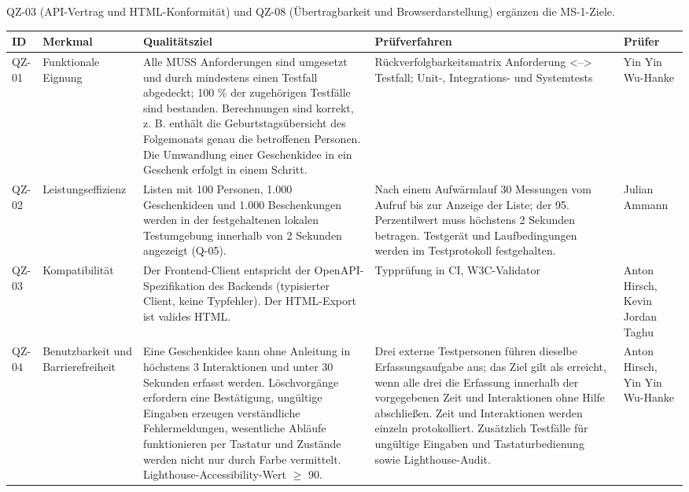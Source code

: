 \documentclass[11pt,a4paper]{article}
\begin{document}
QZ-03 (API-Vertrag und HTML-Konformität) und QZ-08 (Übertragbarkeit und Browserdarstellung) ergänzen die MS-1-Ziele.

{\small
\begin{tabularx}{\linewidth}{@{}l >{\hsize=0.68\hsize\RaggedRight\arraybackslash}X >{\hsize=1.67\hsize\RaggedRight\arraybackslash}X >{\hsize=1.16\hsize\RaggedRight\arraybackslash}X >{\hsize=0.48\hsize\RaggedRight\arraybackslash}X@{}}
\toprule
\textbf{ID} & \textbf{Merkmal} & \textbf{Qualitätsziel} & \textbf{Prüfverfahren} & \textbf{Prüfer} \\
\midrule
\endhead
QZ-01 & Funktionale Eignung & Alle MUSS Anforderungen sind umgesetzt und durch mindestens einen Testfall abgedeckt; 100 \% der zugehörigen Testfälle sind bestanden. Berechnungen sind korrekt, z. B. enthält die Geburtstagsübersicht des Folgemonats genau die betroffenen Personen. Die Umwandlung einer Geschenkidee in ein Geschenk erfolgt in einem Schritt. & Rückverfolgbarkeitsmatrix Anforderung <--> Testfall; Unit-, Integrations- und Systemtests & Yin Yin Wu-Hanke \\
QZ-02 & Leistungseffizienz & Listen mit 100 Personen, 1.000 Geschenkideen und 1.000 Beschenkungen werden in der festgehaltenen lokalen Testumgebung innerhalb von 2 Sekunden angezeigt (Q-05). & Nach einem Aufwärmlauf 30 Messungen vom Aufruf bis zur Anzeige der Liste; der 95. Perzentilwert muss höchstens 2 Sekunden betragen. Testgerät und Laufbedingungen werden im Testprotokoll festgehalten. & Julian Ammann \\
QZ-03 & Kompatibilität & Der Frontend-Client entspricht der OpenAPI-Spezifikation des Backends (typisierter Client, keine Typfehler). Der HTML-Export ist valides HTML. & Typprüfung in CI, W3C-Validator & Anton Hirsch, Kevin Jordan Taghu \\
QZ-04 & Benutzbarkeit und Barrierefreiheit & Eine Geschenkidee kann ohne Anleitung in höchstens 3 Interaktionen und unter 30 Sekunden erfasst werden. Löschvorgänge erfordern eine Bestätigung, ungültige Eingaben erzeugen verständliche Fehlermeldungen, wesentliche Abläufe funktionieren per Tastatur und Zustände werden nicht nur durch Farbe vermittelt. Lighthouse-Accessibility-Wert $\geq$ 90. & Drei externe Testpersonen führen dieselbe Erfassungsaufgabe aus; das Ziel gilt als erreicht, wenn alle drei die Erfassung innerhalb der vorgegebenen Zeit und Interaktionen ohne Hilfe abschließen. Zeit und Interaktionen werden einzeln protokolliert. Zusätzlich Testfälle für ungültige Eingaben und Tastaturbedienung sowie Lighthouse-Audit. & Anton Hirsch, Yin Yin Wu-Hanke \\

\end{tabularx}}
\end{document}
